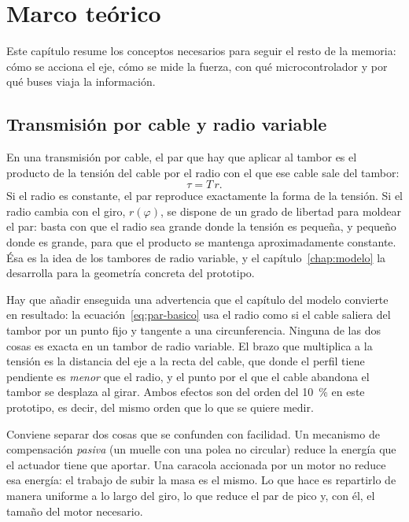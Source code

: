 \chapter{Marco teórico}
\label{chap:marco}

Este capítulo resume los conceptos necesarios para seguir el resto de la memoria: cómo se acciona
el eje, cómo se mide la fuerza, con qué microcontrolador y por qué buses viaja la información.

\section{Transmisión por cable y radio variable}

En una transmisión por cable, el par que hay que aplicar al tambor es el producto de la tensión del
cable por el radio con el que ese cable sale del tambor:
\begin{equation}
  \tau = T\,r .
  \label{eq:par-basico}
\end{equation}
Si el radio es constante, el par reproduce exactamente la forma de la tensión. Si el radio cambia
con el giro, $r(\varphi)$, se dispone de un grado de libertad para moldear el par: basta con que el
radio sea grande donde la tensión es pequeña, y pequeño donde es grande, para que el producto se
mantenga aproximadamente constante. Ésa es la idea de los tambores de radio variable, y el
capítulo~\ref{chap:modelo} la desarrolla para la geometría concreta del prototipo.

Hay que añadir enseguida una advertencia que el capítulo del modelo convierte en resultado: la
ecuación~\eqref{eq:par-basico} usa el radio como si el cable saliera del tambor por un punto fijo y
tangente a una circunferencia. Ninguna de las dos cosas es exacta en un tambor de radio variable. El
brazo que multiplica a la tensión es la distancia del eje a la recta del cable, que donde el perfil
tiene pendiente es \emph{menor} que el radio, y el punto por el que el cable abandona el tambor se
desplaza al girar. Ambos efectos son del orden del \SI{10}{\percent} en este prototipo, es decir, del
mismo orden que lo que se quiere medir.

Conviene separar dos cosas que se confunden con facilidad. Un mecanismo de compensación
\emph{pasiva} (un muelle con una polea no circular) reduce la energía que el actuador tiene que
aportar. Una caracola accionada por un motor no reduce esa energía: el trabajo de subir la masa es
el mismo. Lo que hace es repartirlo de manera uniforme a lo largo del giro, lo que reduce el par de
pico y, con él, el tamaño del motor necesario.

